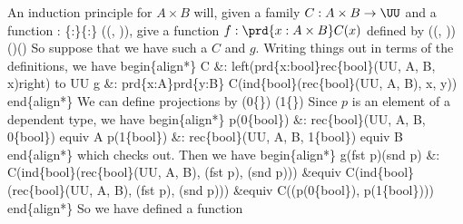 An induction principle for $A \times B$ will, given a family $C : A \times B
\to \UU$ and a function 
   : \{:\}\{:\} ((, )),
give a function $f : \prd{x : A \times B}C(x)$ defined by
  ((, ))  ()()
So suppose that we have such a $C$ and $g$.  Writing things out in terms of the
definitions, we have
begin\{align*\}
  C \&: left(prd\{x:bool\}rec\{bool\}(UU, A, B, x)right) to UU 
  g \&: prd\{x:A\}prd\{y:B\} C(ind\{bool\}(rec\{bool\}(UU, A, B), x, y))
end\{align*\}  
We can define projections by
     (0\coqdocvar{\_}\{\})     (1\coqdocvar{\_}\{\})
Since $p$ is an element of a dependent type, we have
begin\{align*\}
  p(0\{bool\}) \&: rec\{bool\}(UU, A, B, 0\{bool\}) equiv A
  p(1\{bool\}) \&: rec\{bool\}(UU, A, B, 1\{bool\}) equiv B
end\{align*\}
which checks out.  Then we have
begin\{align*\}
  g(fst p)(snd p) 
  \&: C(ind\{bool\}(rec\{bool\}(UU, A, B), (fst p), (snd p)))
  \&equiv 
  C(ind\{bool\}(rec\{bool\}(UU, A, B), (fst p), (snd p)))
  \&equiv 
  C((p(0\{bool\}), p(1\{bool\})))
end\{align*\}
So we have defined a function
